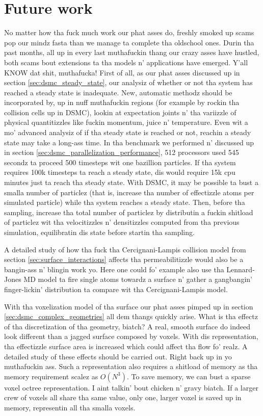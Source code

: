 \section{Future work}
No matter how tha fuck much work our phat asses do, freshly smoked up scams pop our mindz fasta than we manage ta complete tha oldschool ones. Durin tha past months, all up in every last muthafuckin thang our crazy asses have hustled, both scams bout extensions ta tha models n' applications have emerged. Y'all KNOW dat shit, muthafucka! First of all, as our phat asses discussed up in section \ref{sec:dsmc_steady_state}, our analysiz of whether or not tha system has reached a steady state is inadequate. New, automatic methodz should be incorporated by, up in nuff muthafuckin regions (for example by rockin tha collision cells up in DSMC), lookin at expectation joints n' tha variizzle of physical quantitizzles like fuckin momentum, juice n' temperature. Even wit a mo' advanced analysiz of if tha steady state is reached or not, reachin a steady state may take a long-ass time. In tha benchmark we performed n' discussed up in section \ref{sec:dsmc_parallelization_performance}, 512 processors used 545 secondz ta proceed 500 timesteps wit one bazillion particles. If tha system requires 100k timesteps ta reach a steady state, dis would require 15k cpu minutes just ta reach tha steady state. With DSMC, it may be possible ta bust a smalla number of particlez (that is, increase tha number of effectizzle atoms per simulated particle) while tha system reaches a steady state. Then, before tha sampling, increase tha total number of particlez by distributin a fuckin shitload of particlez wit tha velocitizzles n' densitizzles computed from tha previous simulation, equilibratin dis state before startin tha sampling.

A detailed study of how tha fuck tha Cercignani-Lampis collision model from section \ref{sec:surface_interactions} affects tha permeabilitizzle would also be a bangin-ass n' blingin work yo. Here one could fo' example also use tha Lennard-Jones MD model ta fire single atoms towardz a surface n' gather a gangbangin' finger-lickin' distribution ta compare wit tha Cercignani-Lampis model.

With tha voxelization model of tha surface our phat asses pimped up in section \ref{sec:dsmc_complex_geometries} all dem thangs quickly arise. What is tha effectz of tha discretization of tha geometry, biatch? A real, smooth surface do indeed look different than a jagged surface composed by voxels. With dis representation, tha effectizzle surface area is increased which could affect tha flow fo' realz. A detailed study of these effects should be carried out. Right back up in yo muthafuckin ass. Such a representation also requires a shitload of memory as tha memory requirement scalez as $O(N^3)$. To save memory, we can bust a sparse voxel octree representation. I aint talkin' bout chicken n' gravy biatch. If a larger crew of voxels all share tha same value, only one, larger voxel is saved up in memory, representin all tha smalla voxels.

